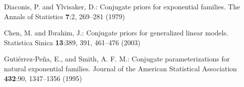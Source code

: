 \begin{thebibliography}{99.}
Diaconis, P. and Ylvisaker, D.: Conjugate priors for exponential families. The Annals of Statistics \textbf{7}:2, 269--281 (1979)


Chen, M. and Ibrahim, J.: Conjugate priors for generalized linear models. Statistica Sinica \textbf{13}:389, 391, 461--476 (2003)

Guti\'errez-Pe\~na, E., and Smith, A. F. M.: Conjugate parameterizations for natural exponential families. Journal of the American Statistical Association \textbf{432}:90, 1347--1356 (1995)






%
%

%

%
\end{thebibliography}
